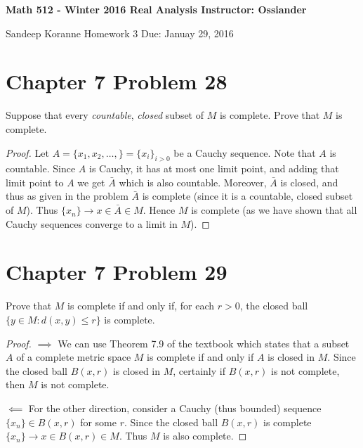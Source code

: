 \documentclass{article}
\newtheorem{proof}{Proof}
\def\le{\leqslant}
\def\to{\rightarrow}
\begin{document}
\thispagestyle{empty}

\textbf{Math 512 - Winter 2016 \hfill Real Analysis  \hfill Instructor: Ossiander}

\hrulefill 
\medskip 

 {Sandeep Koranne \hfill Homework 3 \hfill Due: Januay 29, 2016}
\medskip


\section{Chapter 7 Problem 28} Suppose that every \emph{countable},
 \emph{closed} subset of $M$ is complete. Prove that $M$ is 
complete.
\begin{proof}
Let $A=\{x_1,x_2,\ldots,\}=\{x_i\}_{i> 0}$ be a Cauchy sequence. 
Note that $A$ is countable.
Since $A$ is Cauchy, it has at most one limit point, and adding that
limit point to $A$ we get $\bar{A}$ which is also countable.
Moreover, $\bar{A}$ is closed, and thus as given in the problem
$\bar{A}$ is complete (since it is a countable, closed subset of $M$).
Thus $\{x_n\}\to x\in \bar{A} \in M$. Hence $M$ is complete (as we
have shown that all Cauchy sequences converge to a limit in $M$).

\end{proof}

\section{Chapter 7 Problem 29}
Prove that $M$ is complete if and only if, for each $r>0$, the closed
ball $\{y\in M:d(x,y)\le r\}$ is complete.
\begin{proof}
$\implies$
We can use Theorem 7.9 of the textbook which states that a subset
$A$ of a complete metric space $M$ is complete if and only if $A$
is closed in $M$. Since the closed ball $B(x,r)$ is closed in $M$,
certainly if $B(x,r)$ is not complete, then $M$ is not complete.


$\impliedby$
For the other direction, consider a Cauchy (thus bounded)
sequence $\{x_n\}\in B(x,r)$ for some $r$. Since the closed ball
$B(x,r)$ is complete $\{x_n\}\to x\in B(x,r)\in M$. Thus $M$ is
also complete.

\end{proof}
\end{document}
